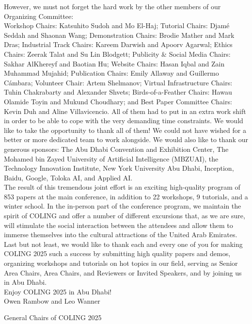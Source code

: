 However, we must not forget the hard work by the other members of our Organizing Committee: \\

Workshop Chairs: Katsuhito Sudoh and Mo El-Haj; Tutorial Chairs: Djamé Seddah and Shaonan Wang; Demonstration Chairs: Brodie Mather and Mark Dras; Industrial Track Chairs: Kareem Darwish and Apoorv Agarwal; Ethics Chairs: Zeerak Talat and Su Lin Blodgett; Publicity \& Social Media Chairs: Sakhar AlKhereyf and Baotian Hu; Website Chairs: Hasan Iqbal and Zain Muhammad Mujahid; Publication Chairs: Emily Allaway and Guillermo Cámbara; Volunteer Chair: Artem Shelmanov; Virtual Infrastructure Chairs: Tuhin Chakrabarty and Alexander Shvets; Birds-of-a-Feather Chairs: Hawau Olamide Toyin and Mukund Choudhary; and Best Paper Committee Chairs: Kevin Duh and Aline Villavicencio. All of them had to put in an extra work shift in order to be able to cope with the very demanding time constraints. We would like to take the opportunity to thank all of them! We could not have wished for a better or more dedicated team to work alongside. We would also like to thank our generous sponsors: The Abu Dhabi Convention and Exhibition Center, The Mohamed bin Zayed University of Artificial Intelligence (MBZUAI), the Technology Innovation Institute, New York University Abu Dhabi, Inception, Baidu, Google, Toloka AI, and Applied AI. \\

The result of this tremendous joint effort is an exciting high-quality program of 853 papers at the main conference, in addition to 22 workshops, 9 tutorials, and a winter school. In the in-person part of the conference program, we maintain the spirit of COLING and offer a number of different excursions that, as we are sure, will stimulate the social interaction between the attendees and allow them to immerse themselves into the cultural attractions of the United Arab Emirates.\\

Last but not least, we would like to thank each and every one of you for making COLING 2025 such a success by submitting high quality papers and demos, organizing workshops and tutorials on hot topics in our field, serving as Senior Area Chairs, Area Chairs, and Reviewers or Invited Speakers, and by joining us in Abu Dhabi.\\

Enjoy COLING 2025 in Abu Dhabi!\\

Owen Rambow and Leo Wanner

General Chairs of COLING 2025
